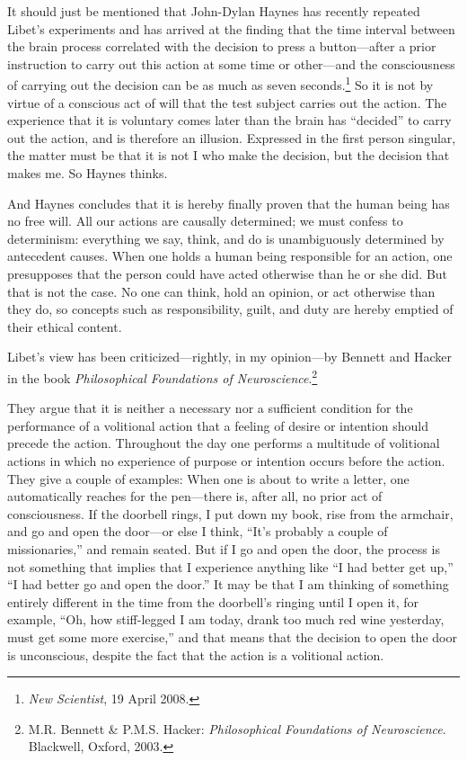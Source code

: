 \documentclass[12pt,a4paper]{book}
\begin{document}
It should just be mentioned that John-Dylan Haynes has recently repeated Libet's experiments and has arrived at the finding that the time interval between the brain process correlated with the decision to press a button---after a prior instruction to carry out this action at some time or other---and the consciousness of carrying out the decision can be as much as seven seconds.\footnote{\emph{New Scientist}, 19 April 2008.} So it is not by virtue of a conscious act of will that the test subject carries out the action. The experience that it is voluntary comes later than the brain has ``decided'' to carry out the action, and is therefore an illusion. Expressed in the first person singular, the matter must be that it is not I who make the decision, but the decision that makes me. So Haynes thinks.

And Haynes concludes that it is hereby finally proven that the human being has no free will. All our actions are causally determined; we must confess to determinism: everything we say, think, and do is unambiguously determined by antecedent causes. When one holds a human being responsible for an action, one presupposes that the person could have acted otherwise than he or she did. But that is not the case. No one can think, hold an opinion, or act otherwise than they do, so concepts such as responsibility, guilt, and duty are hereby emptied of their ethical content.

Libet's view has been criticized---rightly, in my opinion---by Bennett and Hacker in the book \emph{Philosophical Foundations of Neuroscience}.\footnote{M.R. Bennett \& P.M.S. Hacker: \emph{Philosophical Foundations of Neuroscience}. Blackwell, Oxford, 2003.}

They argue that it is neither a necessary nor a sufficient condition for the performance of a volitional action that a feeling of desire or intention should precede the action. Throughout the day one performs a multitude of volitional actions in which no experience of purpose or intention occurs before the action. They give a couple of examples: When one is about to write a letter, one automatically reaches for the pen---there is, after all, no prior act of consciousness. If the doorbell rings, I put down my book, rise from the armchair, and go and open the door---or else I think, ``It's probably a couple of missionaries,'' and remain seated. But if I go and open the door, the process is not something that implies that I experience anything like ``I had better get up,'' ``I had better go and open the door.'' It may be that I am thinking of something entirely different in the time from the doorbell's ringing until I open it, for example, ``Oh, how stiff-legged I am today, drank too much red wine yesterday, must get some more exercise,'' and that means that the decision to open the door is unconscious, despite the fact that the action is a volitional action.
\end{document}
